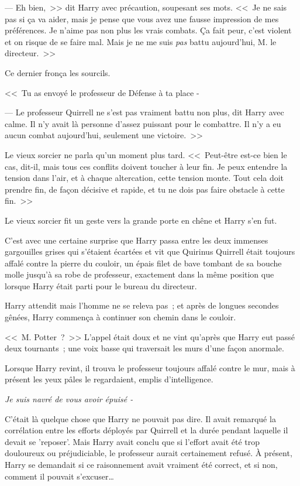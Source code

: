 --- Eh bien,~>> dit Harry avec précaution, soupesant ses mots. <<~Je ne sais pas si ça va aider, mais je pense que vous avez une fausse impression de mes préférences. Je n'aime pas non plus les vrais combats. Ça fait peur, c'est violent et on risque de se faire mal. Mais je ne me suis \emph{pas} battu aujourd'hui, M. le directeur.~>>

Ce dernier fronça les sourcils.

<<~Tu as envoyé le professeur de Défense à ta place -

--- Le professeur Quirrell ne s'est pas vraiment battu non plus, dit Harry avec calme. Il n'y avait là personne d'assez puissant pour le combattre. Il n'y a eu aucun combat aujourd'hui, seulement une victoire.~>>

Le vieux sorcier ne parla qu'un moment plus tard. <<~Peut-être est-ce bien le cas, dit-il, mais tous ces conflits doivent toucher à leur fin. Je peux entendre la tension dans l'air, et à chaque altercation, cette tension monte. Tout cela doit prendre fin, de façon décisive et rapide, et tu ne dois pas faire obstacle à cette fin.~>>

Le vieux sorcier fit un geste vers la grande porte en chêne et Harry s'en fut.

\later

C'est avec une certaine surprise que Harry passa entre les deux immenses gargouilles grises qui s'étaient écartées et vit que Quirinus Quirrell était toujours affalé contre la pierre du couloir, un épais filet de bave tombant de sa bouche molle jusqu'à sa robe de professeur, exactement dans la même position que lorsque Harry était parti pour le bureau du directeur.

Harry attendit mais l'homme ne se releva pas~; et après de longues secondes gênées, Harry commença à continuer son chemin dans le couloir.

<<~M. Potter~?~>> L'appel était doux et ne vint qu'après que Harry eut passé deux tournants~; une voix basse qui traversait les murs d'une façon anormale.

Lorsque Harry revint, il trouva le professeur toujours affalé contre le mur, mais à présent les yeux pâles le regardaient, emplis d'intelligence.

\emph{Je suis navré de vous avoir épuisé -}

C'était là quelque chose que Harry ne pouvait pas dire. Il avait remarqué la corrélation entre les efforts déployés par Quirrell et la durée pendant laquelle il devait se 'reposer'. Mais Harry avait conclu que si l'effort avait été trop douloureux ou préjudiciable, le professeur aurait certainement refusé. À présent, Harry se demandait si ce raisonnement avait vraiment été correct, et si non, comment il pouvait s'excuser…

